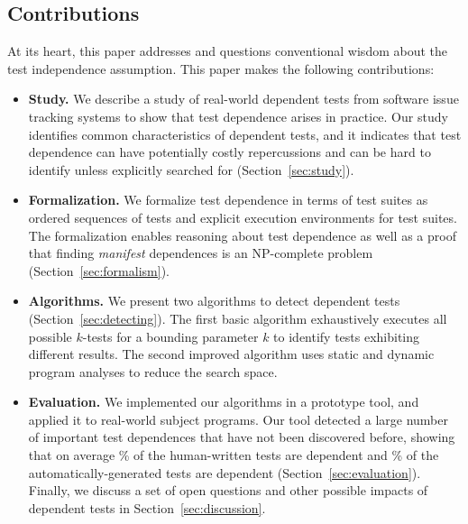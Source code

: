 \subsection{Contributions}

At its heart, this paper addresses and questions
conventional wisdom about the test independence assumption. 
This paper makes the following contributions:

\begin{itemize}

  \item \textbf{Study.} We describe a study of \dtnum real-world
  dependent tests from \repnum software issue tracking
  systems to show that test dependence
  arises in practice. Our study identifies common
  characteristics of dependent tests, and
  it indicates that test dependence can have
  potentially costly repercussions and can be hard to identify unless
  explicitly searched for (Section~\ref{sec:study}).

\item \textbf{Formalization.} We formalize test dependence
  in terms of test suites as ordered sequences of tests and explicit execution
  environments for test suites.  The formalization enables reasoning about test dependence
  as well as a proof that finding \emph{manifest} dependences is an NP-complete
  problem (Section~\ref{sec:formalism}).

  \item \textbf{Algorithms.} We present two algorithms
  to detect dependent tests (Section~\ref{sec:detecting}). The first
  basic algorithm exhaustively executes all possible $k$-tests for
  a bounding parameter $k$ to identify tests exhibiting different results.
  The second improved algorithm uses static and dynamic program analyses
  to reduce the search space. 

  \item \textbf{Evaluation.} We implemented our algorithms in a prototype
  tool, and applied it to  real-world subject programs. Our
  tool detected a large number of important test dependences that have not
  been discovered before, showing that on average \% of the human-written
  tests are dependent and \% of the automatically-generated tests are dependent
   (Section~\ref{sec:evaluation}).
  Finally, we discuss a set of open questions and other possible impacts of dependent
  tests in Section~\ref{sec:discussion}.
\end{itemize}



